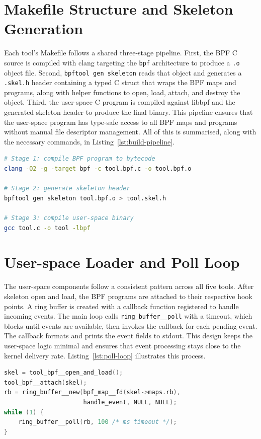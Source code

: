 \documentclass{mnitjaipur}
\begin{document}
\section{Makefile Structure and Skeleton Generation}
Each tool's Makefile follows a shared three-stage pipeline. First, the BPF C source is compiled with clang targeting the \texttt{bpf} architecture to produce a \texttt{.o} object file. Second, \texttt{bpftool gen skeleton} reads that object and generates a \texttt{.skel.h} header containing a typed C struct that wraps the BPF maps and programs, along with helper functions to open, load, attach, and destroy the object. Third, the user-space C program is compiled against libbpf and the generated skeleton header to produce the final binary. This pipeline ensures that the user-space program has type-safe access to all BPF maps and programs without manual file descriptor management. All of this is summarised, along with the necessary commands, in Listing~\ref{lst:build-pipeline}.

\begin{lstlisting}[language=bash,caption={Typical build pipeline for each tool},label={lst:build-pipeline}]
# Stage 1: compile BPF program to bytecode
clang -O2 -g -target bpf -c tool.bpf.c -o tool.bpf.o

# Stage 2: generate skeleton header
bpftool gen skeleton tool.bpf.o > tool.skel.h

# Stage 3: compile user-space binary
gcc tool.c -o tool -lbpf
\end{lstlisting}

\section{User-space Loader and Poll Loop}
The user-space components follow a consistent pattern across all five tools. After skeleton open and load, the BPF programs are attached to their respective hook points. A ring buffer is created with a callback function registered to handle incoming events. The main loop calls \texttt{ring\_buffer\_\_poll} with a timeout, which blocks until events are available, then invokes the callback for each pending event. The callback formats and prints the event fields to stdout. This design keeps the user-space logic minimal and ensures that event processing stays close to the kernel delivery rate. Listing~\ref{lst:poll-loop} illustrates this process.

\begin{lstlisting}[language=C,caption={Generic user-space loader and poll loop pattern},label={lst:poll-loop}]
skel = tool_bpf__open_and_load();
tool_bpf__attach(skel);
rb = ring_buffer__new(bpf_map__fd(skel->maps.rb),
                      handle_event, NULL, NULL);
while (1) {
    ring_buffer__poll(rb, 100 /* ms timeout */);
}
\end{lstlisting}
\end{document}
